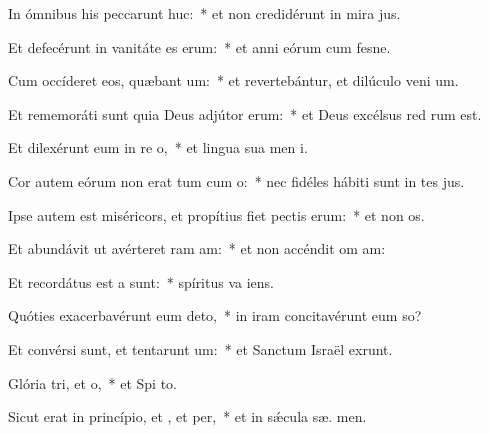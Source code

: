\item In ómnibus his peccarunt huc:~* et non credidérunt in mira jus.
\item Et defecérunt in vanitáte es erum:~* et anni eórum cum fesne.
\item Cum occíderet eos, quæbant um:~* et revertebántur, et dilúculo veni  um.
\item Et rememoráti sunt quia Deus adjútor  erum:~* et Deus excélsus red rum est.
\item Et dilexérunt eum in re o,~* et lingua sua men  i.
\item Cor autem eórum non erat tum cum o:~* nec fidéles hábiti sunt in tes jus.
\item Ipse autem est miséricors, et propítius fiet pectis erum:~* et non  os.
\item Et abundávit ut avérteret ram am:~* et non accéndit om  am:
\item Et recordátus est a  sunt:~* spíritus va   iens.
\item Quóties exacerbavérunt eum  deto,~* in iram concitavérunt eum  so?
\item Et convérsi sunt, et tentarunt um:~* et Sanctum Israël exrunt.
\item Glória tri, et o,~* et Spi to.
\item Sicut erat in princípio, et , et per,~* et in sǽcula sæ. men.
